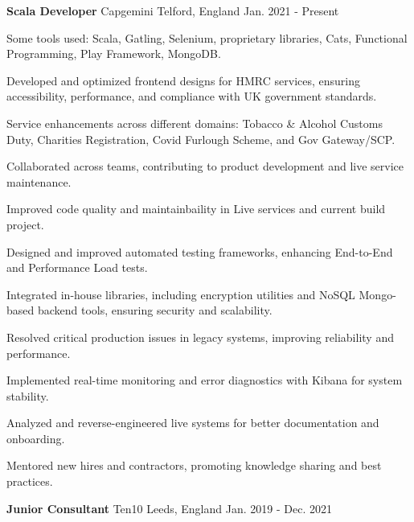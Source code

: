 
\begin{cventries}

  \cventry
    {\textbf{Scala Developer}} %
    {Capgemini} 
    {Telford, England} 
    {Jan. 2021 - Present} 
    {
      \begin{sloppypar}  %
      \begin{cvitems}
        \item {Some tools used: Scala, Gatling, Selenium, proprietary libraries, Cats, Functional Programming, Play Framework, MongoDB.}
        \item {Developed and optimized frontend designs for HMRC services, ensuring accessibility, performance, and compliance with UK government standards.}
        \item {Service enhancements across different domains: Tobacco \& Alcohol Customs Duty, Charities Registration, Covid Furlough Scheme, and Gov Gateway/SCP.}
        \item {Collaborated across teams, contributing to product development and live service maintenance.}
        \item {Improved code quality and maintainbaility in Live services and current build project.}
        \item {Designed and improved automated testing frameworks, enhancing End-to-End and Performance Load tests.}
        \item {Integrated in-house libraries, including encryption utilities and NoSQL Mongo-based backend tools, ensuring security and scalability.}
        \item {Resolved critical production issues in legacy systems, improving reliability and performance.}
        \item {Implemented real-time monitoring and error diagnostics with Kibana for system stability.}
        \item {Analyzed and reverse-engineered live systems for better documentation and onboarding.}
        \item {Mentored new hires and contractors, promoting knowledge sharing and best practices.}
      \end{cvitems}
      \end{sloppypar}
    }
    \cventry
    {\textbf{Junior Consultant}} 
    {Ten10} 
    {Leeds, England} 
    {Jan. 2019 - Dec. 2021}

\end{cventries}
